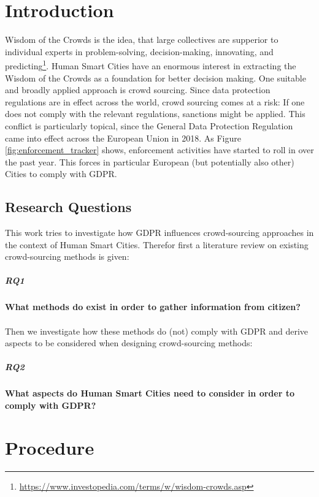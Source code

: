 \documentclass[a4paper,12pt]{report}
\begin{document}
	{\tableofcontents}
	
	\chapter{Introduction}
	Wisdom of the Crowds is the idea, that large collectives are supperior to individual experts in problem-solving, decision-making, innovating, and predicting\footnote{\url{https://www.investopedia.com/terms/w/wisdom-crowds.asp}}. 
	Human Smart Cities have an enormous interest in extracting the Wisdom of the Crowds as a foundation for better decision making.
	One suitable and broadly applied approach is crowd sourcing.
	Since data protection regulations are in effect across the world, crowd sourcing comes at a risk: If one does not comply with the relevant regulations, sanctions might be applied.
	This conflict is particularly topical, since the General Data Protection Regulation came into effect across the European Union in 2018.
	As Figure \ref{fig:enforcement_tracker} shows, enforcement activities have started to roll in over the past year. This forces in particular European (but potentially also other) Cities to comply with GDPR.

	\section{Research Questions}
	\startsection
		This work tries to investigate how GDPR influences crowd-sourcing approaches in the context of Human Smart Cities.
		Therefor first a literature review on existing crowd-sourcing methods is given:
		\paragraph{\textbf{RQ1}}\label{para:RQ1}\textbf{What methods do exist in order to gather information from citizen?} \\ \\
		Then we investigate how these methods do (not) comply with GDPR and derive aspects to be considered when designing crowd-sourcing methods:
		\paragraph{\textbf{RQ2}}\label{para:RQ2}\textbf{What aspects do Human Smart Cities need to consider in order to comply with GDPR?}
	\closesection
	
	
	\chapter{Procedure}
	
\end{document}
